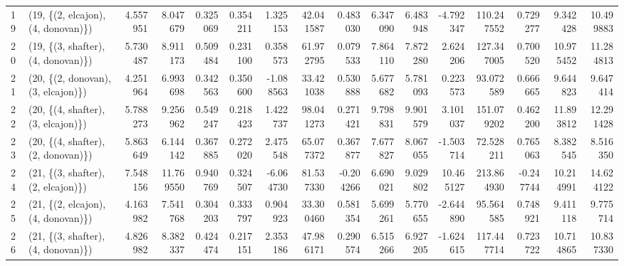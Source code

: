 \begin{tabular}{llrrrrrrrrrrrrrr}
19 &  (19, \{(2, elcajon), (4, donovan)\}) &   4.557951 &   8.047679 &   0.325069 &  0.354211 &   1.325153 &    42.041587 &   0.483030 &   6.347090 &   6.483948 &  -4.792347 &  110.247552 &  0.729277 &   9.342428 &  10.499883 \\
20 &  (19, \{(3, shafter), (4, donovan)\}) &   5.730487 &   8.911173 &   0.509484 &  0.231100 &   0.358573 &    61.972795 &   0.079533 &   7.864110 &   7.872280 &   2.624206 &  127.347005 &  0.700520 &  10.975452 &  11.284813 \\
21 &  (20, \{(2, donovan), (3, elcajon)\}) &   4.251964 &   6.993698 &   0.342563 &  0.350600 &  -1.088563 &    33.421038 &   0.530888 &   5.677682 &   5.781093 &   0.223573 &   93.072589 &  0.666665 &   9.644823 &   9.647414 \\
22 &  (20, \{(4, shafter), (3, elcajon)\}) &   5.788273 &   9.256962 &   0.549247 &  0.218423 &   1.422737 &    98.041273 &   0.271421 &   9.798831 &   9.901579 &   3.101037 &  151.079202 &  0.462200 &  11.893812 &  12.291428 \\
23 &  (20, \{(4, shafter), (2, donovan)\}) &   5.863649 &   6.144142 &   0.367885 &  0.272020 &   2.475548 &    65.077372 &   0.367877 &   7.677827 &   8.067055 &  -1.503714 &   72.528211 &  0.765063 &   8.382545 &   8.516350 \\
24 &  (21, \{(3, shafter), (2, elcajon)\}) &   7.548156 &  11.769550 &   0.940769 &  0.324507 &  -6.064730 &    81.537330 &  -0.204266 &   6.690021 &   9.029802 &  10.465127 &  213.864930 & -0.247744 &  10.214991 &  14.624122 \\
25 &  (21, \{(2, elcajon), (4, donovan)\}) &   4.163982 &   7.541768 &   0.304203 &  0.333797 &   0.904923 &    33.300460 &   0.581354 &   5.699261 &   5.770655 &  -2.644890 &   95.564585 &  0.748921 &   9.411118 &   9.775714 \\
26 &  (21, \{(3, shafter), (4, donovan)\}) &   4.826982 &   8.382337 &   0.424474 &  0.217151 &   2.353186 &    47.986171 &   0.290574 &   6.515266 &   6.927205 &  -1.624615 &  117.447714 &  0.723722 &  10.714865 &  10.837330 \\
\bottomrule
\end{tabular}
